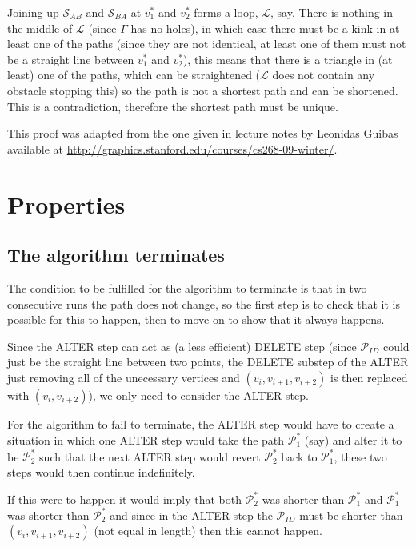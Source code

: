 Joining up $\mathcal{S}_{AB}$ and $\mathcal{S}_{BA}$ at $v_1^*$ and $v_2^*$ forms a loop, $\mathcal{L}$, say. There is nothing in the middle of $\mathcal{L}$ (since $\Gamma$ has no holes), in which case there must be a kink in at least one of the paths (since they are not identical, at least one of them must not be a straight line between $v_1^*$ and $v_2^*$), this means that there is a triangle in (at least) one of the paths, which can be straightened ($\mathcal{L}$ does not contain any obstacle stopping this) so the path is not a shortest path and can be shortened. This is a contradiction, therefore the shortest path must be unique.

This proof was adapted from the one given in lecture notes by Leonidas Guibas available at \url{http://graphics.stanford.edu/courses/cs268-09-winter/}.


\section{Properties}

\subsection{The algorithm terminates}

The condition to be fulfilled for the algorithm to terminate is that in two consecutive runs the path does not change, so the first step is to check that it is possible for this to happen, then to move on to show that it always happens. 

Since the ALTER step can act as (a less efficient) DELETE step (since $\mathcal{P}_{ID}$ could just be the straight line between two points, the DELETE substep of the ALTER just removing all of the unecessary vertices and $(v_i,v_{i+1},v_{i+2})$ is then replaced with $(v_i,v_{i+2})$), we only need to consider the ALTER step.

For the algorithm to fail to terminate, the ALTER step would have to create a situation in which one ALTER step would take the path $\mathcal{P}_1^*$ (say) and alter it to be $\mathcal{P}_2^*$ such that the next ALTER step would revert $\mathcal{P}_2^*$ back to $\mathcal{P}_1^*$, these two steps would then continue indefinitely.

If this were to happen it would imply that both $\mathcal{P}_2^*$ was shorter than $\mathcal{P}_1^*$ and $\mathcal{P}_1^*$ was shorter than $\mathcal{P}_2^*$ and since in the ALTER step the $\mathcal{P}_{ID}$ must be shorter than $(v_i,v_{i+1},v_{i+2})$ (not equal in length) then this cannot happen.

